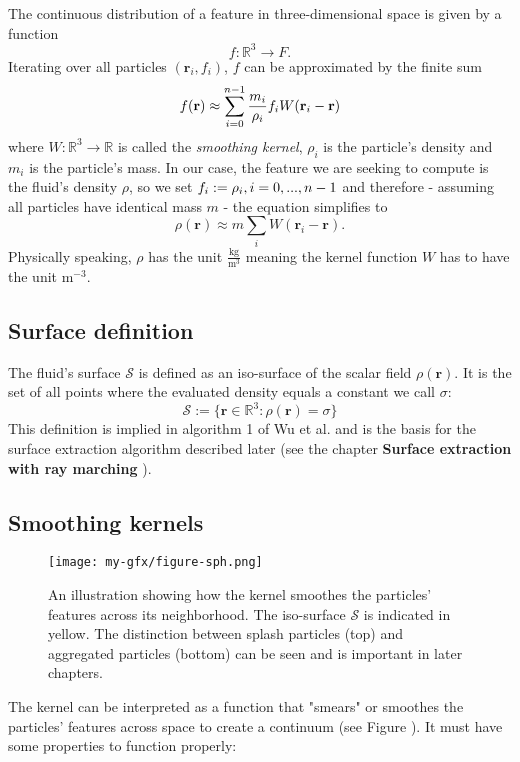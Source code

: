 The continuous distribution of a feature in three-dimensional space is given by a function
\[
f: \mathbb{R}^3 \rightarrow F.
\]
Iterating over all particles $(\textbf{r}_i, f_i)$, $f$ can be approximated by the finite sum
\[
f(\textbf{r}) \approx \sum_{i=0}^{n-1} \space \frac{m_i}{\rho_i} \space f_i \space W(\textbf{r}_i - \textbf{r})
\]
where $W: \mathbb{R}^3 \rightarrow \mathbb{R}$ is called the \textit{smoothing kernel}, $\rho_i$ is the particle's density and $m_i$ is the particle's mass. In our case, the feature we are seeking to compute is the fluid's density $\rho$, so we set $f_i := \rho_i, \space i = 0,...,n-1$ and therefore - assuming all particles have identical mass $m$ - the equation simplifies to
\[
\rho(\textbf{r}) \approx m \sum_i W(\textbf{r}_i - \textbf{r}).
\]
Physically speaking, $\rho$ has the unit $\frac{\text{kg}}{\text{m}^3}$ meaning the kernel function $W$ has to have the unit $\text{m}^{-3}$.

\subsection{Surface definition}
\label{sec:surfacedefinition}

The fluid's surface $\mathcal{S}$ is defined as an iso-surface of the scalar field $\rho(\textbf{r})$. It is the set of all points where the evaluated density equals a constant we call $\sigma$:
\[
\mathcal{S} := \{ \textbf{r} \in \mathbb{R}^3 : \rho(\textbf{r}) = \sigma \}
\]
This definition is implied in algorithm 1 of Wu et al. \cite{Wu:2022} and is the basis for the surface extraction algorithm described later (see the chapter \textbf{Surface extraction with ray marching }).

\subsection{Smoothing kernels}

\begin{figure}[h]
    \centering
    \texttt{[image: my-gfx/figure-sph.png]}
    \caption{An illustration showing how the kernel smoothes the particles' features across its neighborhood. The iso-surface $\mathcal{S}$ is indicated in yellow. The distinction between splash particles (top) and aggregated particles (bottom) can be seen and is important in later chapters.}
    \label{fig:sph}
\end{figure}

The kernel can be interpreted as a function that "smears" or smoothes the particles' features across space to create a continuum (see Figure ). It must have some properties to function properly:

